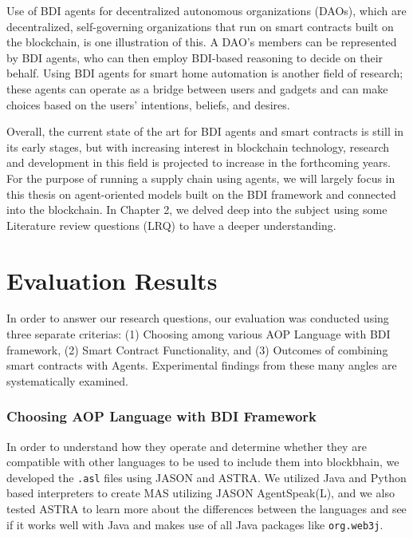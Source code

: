 \vspace{.5cm}
Use of \ac{BDI} agents for decentralized autonomous organizations (DAOs), which are decentralized, self-governing organizations that run on smart contracts built on the blockchain, is one illustration of this. A DAO's members can be represented by \ac{BDI} agents, who can then employ \ac{BDI}-based reasoning to decide on their behalf. Using \ac{BDI} agents for smart home automation is another field of research; these agents can operate as a bridge between users and gadgets and can make choices based on the users' intentions, beliefs, and desires.

\vspace{.5cm}

Overall, the current state of the art for \ac{BDI} agents and smart contracts is still in its early stages, but with increasing interest in blockchain technology, research and development in this field is projected to increase in the forthcoming years. For the purpose of running a supply chain using agents, we will largely focus in this thesis on agent-oriented models built on the \ac{BDI} framework and connected into the blockchain. In Chapter 2, we delved deep into the subject using some Literature review questions (LRQ) to have a deeper understanding.

\section{Evaluation Results}

In order to answer our research questions, our evaluation was conducted using three separate criterias: (1) Choosing among various \ac{AOP} Language with \ac{BDI} framework, (2) Smart Contract Functionality, and (3) Outcomes of combining smart contracts with Agents. Experimental findings from these many angles are systematically examined.

\subsubsection{Choosing \ac{AOP} Language with \ac{BDI} Framework}

  In order to understand how they operate and determine whether they are compatible with other languages to be used to include them into blockbhain, we developed the \texttt{.asl} files using JASON and ASTRA. We utilized Java and Python based interpreters to create \ac{MAS} utilizing JASON AgentSpeak(L), and we also tested ASTRA to learn more about the differences between the languages and see if it works well with Java and makes use of all Java packages like \texttt{org.web3j}. 

